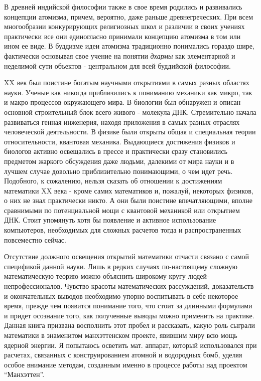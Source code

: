 В древней индийской философии также в свое время родились и развивались концепции атомизма, причем, вероятно, даже раньше древнегреческих.
При всем многообразии конкурирующих религиозных школ и различии в своих учениях практически все они единогласно принимали концепцию атомизма в том или ином ее виде.
В буддизме идеи атомизма традиционно понимались гораздо шире, фактически основывая свое учение на понятии \textit{дхармы} как элементарной и неделимой сути объектов - центральном для всей буддийской философии.




XX век был поистине богатым научными открытиями в самых разных областях науки. Ученые как никогда приблизились к пониманию механики как микро, так и макро процессов окружающего мира. В биологии был обнаружен и описан основной строительный блок всего живого - молекула ДНК. Стремительно начала развиваться генная инженерия, находя приложения в самых разных отраслях человеческой деятельности. В физике были открыты общая и специальная теории относительности, квантовая механика. Выдающиеся достижения физиков и биологов активно освещались в прессе и практически сразу становились предметом жаркого обсуждения даже людьми, далекими от мира науки и в лучшем случае довольно приблизительно понимающими, о чем идет речь. 
Подобного, к сожалению, нельзя сказать об отношении к достижениям математики XX века - кроме самих математиков и, пожалуй, некоторых физиков, о них не знал практически никто. А они были поистине впечатляющими, вполне сравнимыми по потенциальной мощи с квантовой механикой или открытием ДНК. Стоит упомянуть хотя бы появление и активное использование компьютеров, необходимых для сложных расчетов тогда и распространенных повсеместно сейчас.

Отсутствие должного освещения открытий математики отчасти связано с самой спецификой данной науки. Лишь в редких случаях по-настоящему сложную математическую теорию можно объяснить широкому кругу людей-непрофессионалов. Чувство красоты математических рассуждений, доказательств и окончательных выводов необходимо упорно воспитывать в себе некоторое время, прежде чем появится понимание того, что стоит за длинными формулами и придет осознание того, как полученные выводы можно применить на практике.
Данная книга призвана восполнить этот пробел и рассказать, какую роль сыграли математики в знаменитом манхэттенском проекте, явившим миру всю мощь ядерной энергии. Я попытаюсь осветить мат. аппарат, который использовался при расчетах, связанных с конструированием атомной и водородных бомб, уделяя особое внимание методам, созданным именно в процессе работы над проектом “Манхэттен”.


